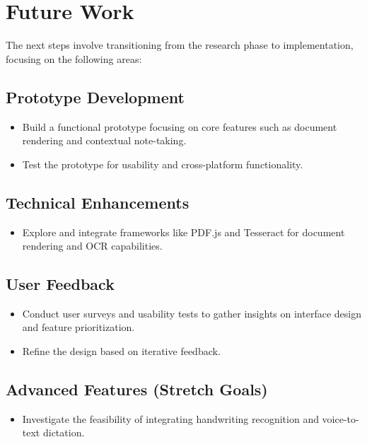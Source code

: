 \section{Future Work}
The next steps involve transitioning from the research phase to implementation, focusing on the following areas:

\subsection{Prototype Development}
\begin{itemize}
    \item Build a functional prototype focusing on core features such as document rendering and contextual note-taking.
    \item Test the prototype for usability and cross-platform functionality.
\end{itemize}

\subsection{Technical Enhancements}
\begin{itemize}
    \item Explore and integrate frameworks like PDF.js and Tesseract for document rendering and OCR capabilities.
\end{itemize}

\subsection{User Feedback}
\begin{itemize}
    \item Conduct user surveys and usability tests to gather insights on interface design and feature prioritization.
    \item Refine the design based on iterative feedback.
\end{itemize}

\subsection{Advanced Features (Stretch Goals)}
\begin{itemize}
    \item Investigate the feasibility of integrating handwriting recognition and voice-to-text dictation.
\end{itemize}

